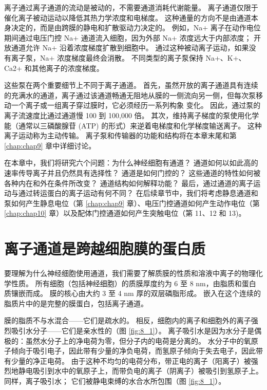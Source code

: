 离子通过离子通道的流动是被动的，不需要通道消耗代谢能量。 
离子通道仅限于催化离子被动运动以降低其热力学浓度和电梯度。 
这种通量的方向不是由通道本身决定的，而是由跨膜的静电和扩散驱动力决定的。 
例如，Na+ 离子在动作电位期间通过电压门控 Na+ 通道流入细胞，因为外部 Na+ 浓度远大于内部浓度； 开放通道允许 Na+ 沿着浓度梯度扩散到细胞中。 
通过这种被动离子运动，如果没有离子泵，Na+ 浓度梯度最终会消散。 
不同类型的离子泵保持 Na+、K+、Ca2+ 和其他离子的浓度梯度。


这些泵在两个重要细节上不同于离子通道。 
首先，虽然开放的离子通道具有连续的充满水的通道，离子通过该通道畅通无阻地从膜的一侧流向另一侧，但每次泵移动一个离子或一组离子穿过膜时，它必须经历一系列构象 变化。 
因此，通过泵的离子流速度比通过通道慢 100 到 100,000 倍。 
其次，维持离子梯度的泵使用化学能（通常以三磷酸腺苷 (ATP) 的形式）来逆着电梯度和化学梯度输送离子。 
这种离子运动称为主动传输。 
离子泵和传输器的功能和结构将在本章末尾和第 \ref{chap:chap9} 章中详细讨论。


在本章中，我们将研究六个问题：为什么神经细胞有通道？ 
通道如何以如此高的速率传导离子并且仍然具有选择性？ 
通道是如何门控的？ 
这些通道的特性如何被各种内在和外在条件所改变？ 
通道结构如何解释功能？ 
最后，通过通道的离子运动与通过转运蛋白的离子运动有何不同？ 
在后续章节中，我们将考虑静息通道和泵如何产生静息电位（第 \ref{chap:chap9} 章）、电压门控通道如何产生动作电位（第 \ref{chap:chap10} 章）以及配体门控通道如何产生突触电位（第 11、12 和 13)。


\section{离子通道是跨越细胞膜的蛋白质}
要理解为什么神经细胞使用通道，我们需要了解质膜的性质和溶液中离子的物理化学性质。 
所有细胞（包括神经细胞）的质膜厚度约为 6 至 8 nm，由脂质和蛋白质镶嵌而成。 
膜的核心由大约 3 至 4 nm 厚的双层磷脂形成。 
嵌入在这个连续的脂质片中的是完整的膜蛋白，包括离子通道。


膜的脂质不与水混合——它们是疏水的。 
相反，细胞内的离子和细胞外的离子强烈吸引水分子——它们是亲水性的（图 \ref{fig:8_1}）。 
离子吸引水是因为水分子是偶极的：虽然水分子上的净电荷为零，但分子内的电荷是分离的。 
水分子中的氧原子倾向于吸引电子，因此带有少量的净负电荷，而氢原子倾向于失去电子，因此带有少量的净正电荷。 
由于这种不均匀的电荷分布，带正电的离子（阳离子）被强烈地静电吸引到水中的氧原子上，而带负电的离子（阴离子）被吸引到氢原子上。 
同样，离子吸引水； 它们被静电束缚的水合水所包围（图 \ref{fig:8_1}）。

